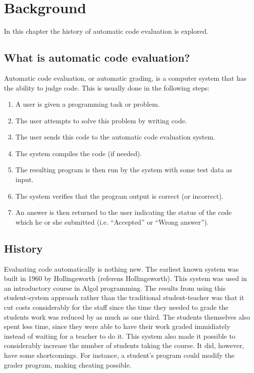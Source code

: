 \chapter{Background}
In this chapter the history of automatic code evaluation is explored.

\section{What is automatic code evaluation?}
Automatic code evaluation, or automatic grading, is a computer system that has the ability to judge code. This is usually done in the following steps:
\begin{enumerate}
  \item A user is given a programming task or problem.
  \item The user attempts to solve this problem by writing code.
  \item The user sends this code to the automatic code evaluation system.
  \item The system compiles the code (if needed).
  \item The resulting program is then run by the system with some test data as input.
  \item The system verifies that the program output is correct (or incorrect). 
  \item An answer is then returned to the user indicating the status of the code which he or she submitted (i.e. ``Accepted'' or ``Wrong answer'').
\end{enumerate}


\section{History}
Evaluating code automatically is nothing new. The earliest known system was built in 1960 by Hollingsworth (referens Hollingsworth). This system was used in an introductory course in Algol programming. The results from using this student-system approach rather than the traditional student-teacher was that it cut costs considerably for the staff since the time they needed to grade the students work was reduced by as much as one third. The students themselves also spent less time, since they were able to have their work graded immidiately instead of waiting for a teacher to do it. This system also made it possible to considerably increase the number of students taking the course. It did, however, have some shortcomings. For instance, a student's program could modify the grader program, making cheating possible. 


